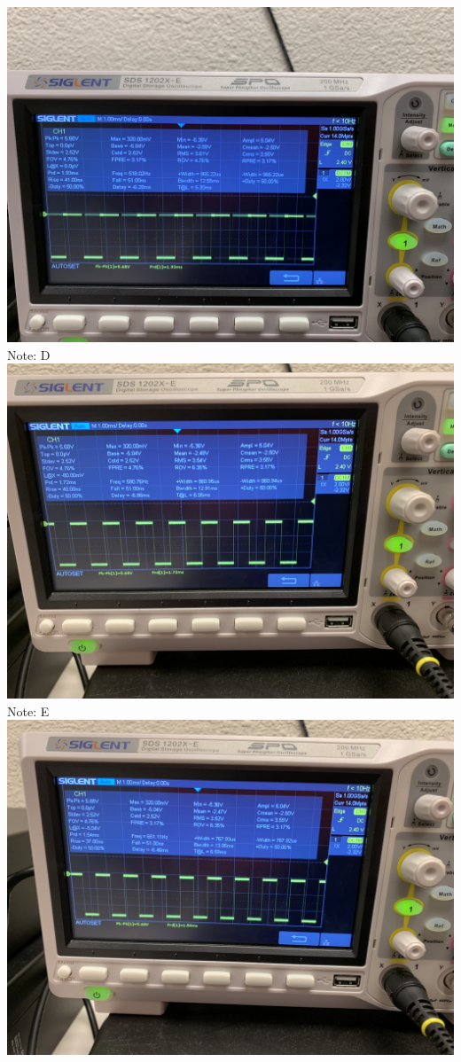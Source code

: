 \documentclass[]{article}
\begin{document}
\begin{center}
		\includegraphics[scale=.05]{./images/2.jpg}\\
		\pagebreak
		Note: D\\
		\includegraphics[scale=.05]{./images/3.jpg}\\
		Note: E\\
		\includegraphics[scale=.05]{./images/4.jpg}\\

\end{center}
\end{document}
